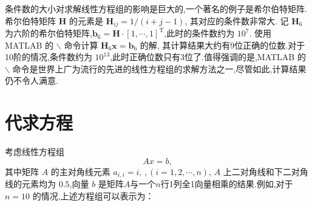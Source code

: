 \documentclass[a4paper]{article}
\numberwithin{equation}{section}
\newcommand{\bm}[1]{\boldsymbol{#1}}    %
\begin{document}
条件数的大小对求解线性方程组的影响是巨大的,一个著名的例子是希尔伯特矩阵.希尔伯特矩阵 $\bm{H}$ 的元素是  $\bm{H}_{i j}=1 /(i+j-1)$, 其对应的条件数非常大. 记 $\bm{H}_6$ 为六阶的希尔伯特矩阵,$\bm{b}_6=\bm{H} \cdot[1, \cdots, 1]^{\mathrm{T}}$,此时的条件数约为 $10^7$. 使用 MATLAB 的 $\backslash$ 命令计算  $\bm{H}_{6}\bm{x}=\bm{b}_6$ 的解, 其计算结果大约有9位正确的位数.对于10阶的情况,条件数约为 $10^{13}$,此时正确位数只有3位了.值得强调的是,MATLAB 的 $\backslash$ 命令是世界上广为流行的先进的线性方程组的求解方法之一,尽管如此,计算结果仍不令人满意.
\section{代求方程}
考虑线性方程组
\begin{equation}
    \label{equ:targetEquation}
    Ax=b,
\end{equation}
其中矩阵 $A$ 的主对角线元素 $a_{i,i}=i,\,,(i=1,2,\cdots,n)$, $A$ 上二对角线和下二对角线的元素均为 $0.5$,向量 $b$ 是矩阵$A$与一个$n$行1列全1向量相乘的结果.例如,对于 $n=10$ 的情况,上述方程组可以表示为：
\end{document}
